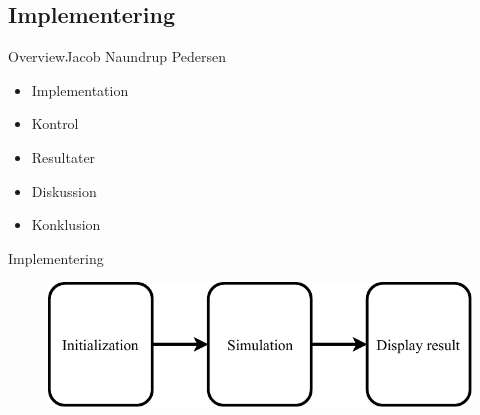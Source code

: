 \subsection{Implementering}


\begin{frame}{Overview}{Jacob Naundrup Pedersen}
 \vfill\vfill\centering  
\begin{itemize}
	
\item Implementation
\item Kontrol
\item Resultater
\item Diskussion
\item Konklusion
\end{itemize}
 \vfill\vfill
\end{frame}


\begin{frame}{Implementering}{}
 \vfill\vfill\centering  
\begin{figure}[H]
\centering
\includegraphics[width=0.75 \textwidth]{figures/Basic_implementation}
\label{fig:Basic_Implementering}
\end{figure}
 \vfill\vfill

\end{frame}

